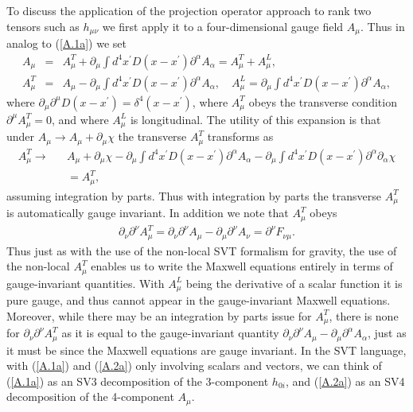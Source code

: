 To discuss the application of the projection operator approach to rank two tensors such as $h_{\mu\nu}$ we first apply it to a four-dimensional gauge field $A_{\mu}$. Thus in analog to (\ref{A.1a}) we set
%
\begin{eqnarray}
A_{\mu}&=&A^T_{\mu}+\partial_{\mu}\int d^4x^{\prime}D(x-x^{\prime})\partial^{\alpha}A_{\alpha}=A^T_{\mu}+A^L_{\mu},
\\
A^T_{\mu}&=&A_{\mu}-\partial_{\mu}\int d^4x^{\prime}D(x-x^{\prime})\partial^{\alpha}A_{\alpha},\quad A_{\mu}^L=\partial_{\mu}\int d^4x^{\prime}D(x-x^{\prime})\partial^{\alpha}A_{\alpha},
\nonumber
\label{A.2a}
\end{eqnarray}
%
where $\partial_{\mu}\partial^{\mu}D(x-x^{\prime})=\delta^4(x-x^{\prime})$, where $A^T_{\mu}$ obeys the transverse condition $\partial^{\mu}A^T_{\mu}=0$, and where $A_{\mu}^L$ is longitudinal. The utility of this expansion is that under  $A_{\mu}\rightarrow A_{\mu}+\partial_{\mu}\chi$ the transverse $A^T_{\mu}$ transforms as 
%
\begin{eqnarray}
A^T_{\mu}\rightarrow&& A_{\mu}+\partial_{\mu}\chi-\partial_{\mu}\int d^4x^{\prime}D(x-x^{\prime})\partial^{\alpha}A_{\alpha}
-\partial_{\mu}\int d^4x^{\prime}D(x-x^{\prime})\partial^{\alpha}\partial_{\alpha}\chi 
\nonumber\\
&&=A_{\mu}^T,
\label{A.3a}
\end{eqnarray}
%
assuming integration by parts. Thus with integration by parts the transverse $A^T_{\mu}$ is automatically gauge invariant. In addition we note that $A_{\mu}^T$ obeys 
%
\begin{eqnarray}
\partial_{\nu}\partial^{\nu}A^T_{\mu}=\partial_{\nu}\partial^{\nu}A_{\mu}-\partial_{\mu}\partial^{\nu}A_{\nu}=\partial^{\nu}F_{\nu\mu}.
\label{A.4a}
\end{eqnarray}
%
Thus just as with the use of the non-local SVT formalism for gravity, the use of the non-local $A_{\mu}^T$ enables us to write the Maxwell equations entirely in terms of gauge-invariant quantities. With $A_{\mu}^L$ being the derivative of a scalar function it is pure gauge, and thus cannot appear in the gauge-invariant Maxwell equations. Moreover, while there may be an integration by parts issue for $A_{\mu}^T$, there is none for $\partial_{\nu}\partial^{\nu}A^T_{\mu}$ as it is equal to the gauge-invariant quantity $\partial_{\nu}\partial^{\nu}A_{\mu}-\partial_{\mu}\partial^{\alpha}A_{\alpha}$, just as it must be since the Maxwell equations are gauge invariant.
In the SVT language, with (\ref{A.1a}) and (\ref{A.2a}) only involving scalars and vectors, we can think of (\ref{A.1a}) as an SV3 decomposition of the 3-component $h_{0i}$, and (\ref{A.2a}) as an SV4 decomposition of the 4-component $A_{\mu}$.

